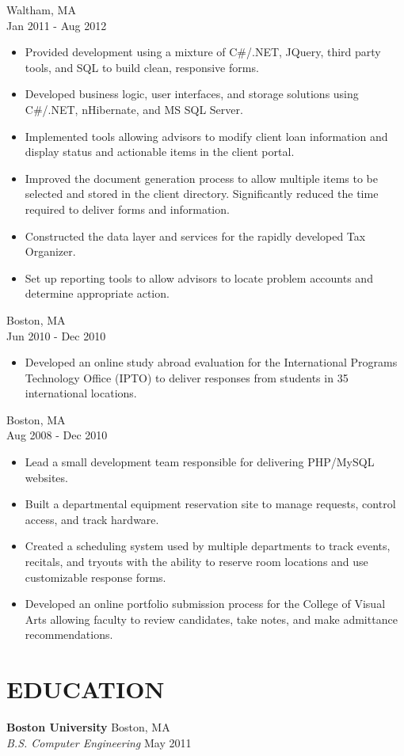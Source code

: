 \documentclass[10pt]{article}
\begin{document}
 \hfill Waltham, MA \\
 \hfill Jan 2011 - Aug 2012
\begin{itemize}
\setlength\itemsep{0em}
\item Provided development using a mixture of C\#/.NET, JQuery, third party tools, and SQL to build clean, responsive forms.
\item Developed business logic, user interfaces, and storage solutions using C\#/.NET, nHibernate, and MS SQL Server.
\item Implemented tools allowing advisors to modify client loan information and display status and actionable items in the client portal.
\item Improved the document generation process to allow multiple items to be selected and stored in the client directory. Significantly reduced the time required to deliver forms and information.
\item Constructed the data layer and services for the rapidly developed Tax Organizer.
\item Set up reporting tools to allow advisors to locate problem accounts and determine appropriate action.
\end{itemize}

 \hfill Boston, MA \\
 \hfill Jun 2010 - Dec 2010
\begin{itemize}
\setlength\itemsep{0em}
\item Developed an online study abroad evaluation for the International Programs Technology Office (IPTO) to deliver responses from students in 35 international locations.
\end{itemize}

 \hfill Boston, MA \\
 \hfill Aug 2008 - Dec 2010
\begin{itemize}
\setlength\itemsep{0em}
\item Lead a small development team responsible for delivering PHP/MySQL websites. 
\item Built a departmental equipment reservation site to manage requests, control access, and track hardware.
\item Created a scheduling system used by multiple departments to track events, recitals, and tryouts with the ability to reserve room locations and use customizable response forms.
\item Developed an online portfolio submission process for the College of Visual Arts allowing faculty to review candidates, take notes, and make admittance recommendations.
\end{itemize}

\section*{EDUCATION}

{\bf Boston University} \hfill Boston, MA \\
{\sl B.S. Computer Engineering} \hfill May 2011
\end{document}
